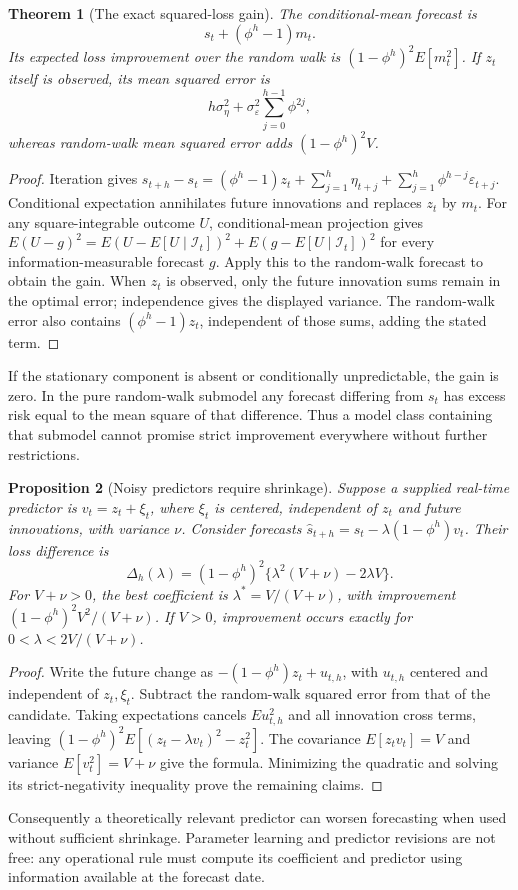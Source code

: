 \documentclass[11pt]{article}
\newtheorem{theorem}{Theorem}
\newtheorem{proposition}[theorem]{Proposition}
\theoremstyle{remark}
\begin{document}
\begin{theorem}[The exact squared-loss gain]
The conditional-mean forecast is
\[
 s_t+(\phi^h-1)m_t.
\]
Its expected loss improvement over the random walk is
$(1-\phi^h)^2E[m_t^2]$. If $z_t$ itself is observed, its mean squared error is
\[
 h\sigma_\eta^2+\sigma_\varepsilon^2\sum_{j=0}^{h-1}\phi^{2j},
\]
whereas random-walk mean squared error adds $(1-\phi^h)^2V$.
\end{theorem}
\begin{proof}
Iteration gives
$s_{t+h}-s_t=(\phi^h-1)z_t+\sum_{j=1}^h\eta_{t+j}+\sum_{j=1}^h\phi^{h-j}\varepsilon_{t+j}$.
Conditional expectation annihilates future innovations and replaces $z_t$ by $m_t$. For any square-integrable outcome $U$, conditional-mean projection gives
$E(U-g)^2=E(U-E[U\mid\mathcal I_t])^2+E(g-E[U\mid\mathcal I_t])^2$
for every information-measurable forecast $g$. Apply this to the random-walk forecast to obtain the gain. When $z_t$ is observed, only the future innovation sums remain in the optimal error; independence gives the displayed variance. The random-walk error also contains $(\phi^h-1)z_t$, independent of those sums, adding the stated term.
\end{proof}
If the stationary component is absent or conditionally unpredictable, the gain is zero. In the pure random-walk submodel any forecast differing from $s_t$ has excess risk equal to the mean square of that difference. Thus a model class containing that submodel cannot promise strict improvement everywhere without further restrictions.

\begin{proposition}[Noisy predictors require shrinkage]
Suppose a supplied real-time predictor is $v_t=z_t+\xi_t$, where $\xi_t$ is centered, independent of $z_t$ and future innovations, with variance $\nu$. Consider forecasts
$\widehat s_{t+h}=s_t-\lambda(1-\phi^h)v_t$. Their loss difference is
\[
 \Delta_h(\lambda)=(1-\phi^h)^2\{\lambda^2(V+\nu)-2\lambda V\}.
\]
For $V+\nu>0$, the best coefficient is $\lambda^*=V/(V+\nu)$, with improvement $(1-\phi^h)^2V^2/(V+\nu)$. If $V>0$, improvement occurs exactly for $0<\lambda<2V/(V+\nu)$.
\end{proposition}
\begin{proof}
Write the future change as $-(1-\phi^h)z_t+u_{t,h}$, with $u_{t,h}$ centered and independent of $z_t,\xi_t$. Subtract the random-walk squared error from that of the candidate. Taking expectations cancels $Eu_{t,h}^2$ and all innovation cross terms, leaving
$(1-\phi^h)^2E[(z_t-\lambda v_t)^2-z_t^2]$.
The covariance $E[z_tv_t]=V$ and variance $E[v_t^2]=V+\nu$ give the formula. Minimizing the quadratic and solving its strict-negativity inequality prove the remaining claims.
\end{proof}
Consequently a theoretically relevant predictor can worsen forecasting when used without sufficient shrinkage. Parameter learning and predictor revisions are not free: any operational rule must compute its coefficient and predictor using information available at the forecast date.
\end{document}
